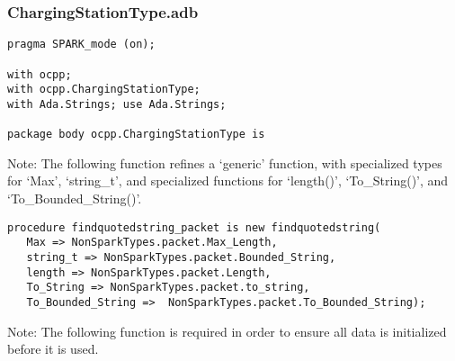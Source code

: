 \documentclass[12pt,openany,a4paper]{book}
\begin{document}
\subsubsection{ChargingStationType.adb}
\begin{verbatim}
pragma SPARK_mode (on); 

with ocpp;
with ocpp.ChargingStationType;
with Ada.Strings; use Ada.Strings;

package body ocpp.ChargingStationType is 

\end{verbatim} 
Note: The following function refines a `generic' function, with specialized types for `Max', `string\_t', and specialized functions for `length()', `To\_String()', and `To\_Bounded\_String()'.
\begin{verbatim}
procedure findquotedstring_packet is new findquotedstring(
   Max => NonSparkTypes.packet.Max_Length, 
   string_t => NonSparkTypes.packet.Bounded_String, 
   length => NonSparkTypes.packet.Length,
   To_String => NonSparkTypes.packet.to_string,
   To_Bounded_String =>  NonSparkTypes.packet.To_Bounded_String);

\end{verbatim} 
Note: The following function is required in order to ensure all data is initialized before it is used.
\end{document}
